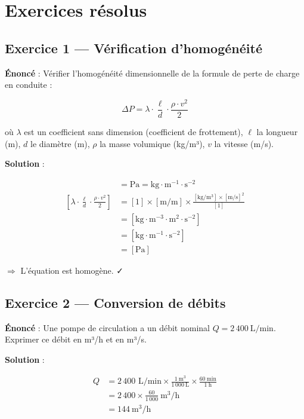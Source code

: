 \section{Exercices résolus}

\subsection*{Exercice 1 — Vérification d'homogénéité}

\textbf{Énoncé} : Vérifier l'homogénéité dimensionnelle de la formule de perte de charge en
conduite :

\[
  \Delta P = \lambda \cdot \frac{\ell}{d} \cdot \frac{\rho \cdot v^2}{2}
\]

où $\lambda$ est un coefficient sans dimension (coefficient de frottement), $\ell$ la longueur
(m), $d$ le diamètre (m), $\rho$ la masse volumique (kg/m³), $v$ la vitesse (m/s).

\textbf{Solution} :

\begin{align*}
  [\Delta P] &= \mathrm{Pa} = \mathrm{kg \cdot m^{-1} \cdot s^{-2}} \\
  [\lambda \cdot \frac{\ell}{d} \cdot \frac{\rho \cdot v^2}{2}] &= [1] \times [\mathrm{m/m}]
  \times \frac{[\mathrm{kg/m^3}] \times [\mathrm{m/s}]^2}{[1]} \\
  &= [\mathrm{kg \cdot m^{-3} \cdot m^2 \cdot s^{-2}}] \\
  &= [\mathrm{kg \cdot m^{-1} \cdot s^{-2}}] \\
  &= [\mathrm{Pa}]
\end{align*}

$\Rightarrow$ L'équation est homogène. ✓

\subsection*{Exercice 2 — Conversion de débits}

\textbf{Énoncé} : Une pompe de circulation a un débit nominal $Q = 2\,400~\mathrm{L/min}$.
Exprimer ce débit en m³/h et en m³/s.

\textbf{Solution} :

\begin{align*}
  Q &= 2\,400 \text{ L/min} \times \frac{1~\mathrm{m^3}}{1\,000~\mathrm{L}} \times
  \frac{60~\mathrm{min}}{1~\mathrm{h}} \\
  &= 2\,400 \times \frac{60}{1\,000}~\mathrm{m^3/h} \\
  &= 144~\mathrm{m^3/h}
\end{align*}

